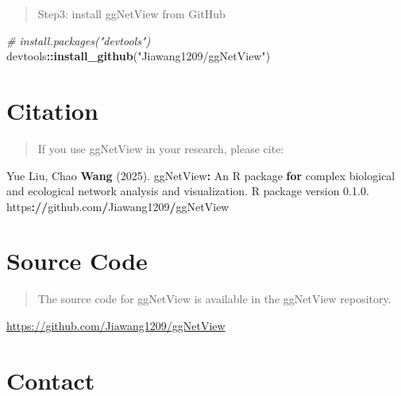 \documentclass[
]{book}
\newenvironment{Shaded}{\begin{snugshade}}{\end{snugshade}}
\newcommand{\CommentTok}[1]{\textcolor[rgb]{0.56,0.35,0.01}{\textit{#1}}}
\newcommand{\ControlFlowTok}[1]{\textcolor[rgb]{0.13,0.29,0.53}{\textbf{#1}}}
\newcommand{\DecValTok}[1]{\textcolor[rgb]{0.00,0.00,0.81}{#1}}
\newcommand{\ErrorTok}[1]{\textcolor[rgb]{0.64,0.00,0.00}{\textbf{#1}}}
\newcommand{\FloatTok}[1]{\textcolor[rgb]{0.00,0.00,0.81}{#1}}
\newcommand{\FunctionTok}[1]{\textcolor[rgb]{0.13,0.29,0.53}{\textbf{#1}}}
\newcommand{\NormalTok}[1]{#1}
\newcommand{\SpecialCharTok}[1]{\textcolor[rgb]{0.81,0.36,0.00}{\textbf{#1}}}
\newcommand{\StringTok}[1]{\textcolor[rgb]{0.31,0.60,0.02}{#1}}
\begin{document}
\begin{quote}
Step3: install ggNetView from GitHub
\end{quote}

\begin{Shaded}
\begin{Highlighting}[]
\CommentTok{\# install.packages("devtools")}
\NormalTok{devtools}\SpecialCharTok{::}\FunctionTok{install\_github}\NormalTok{(}\StringTok{"Jiawang1209/ggNetView"}\NormalTok{)}
\end{Highlighting}
\end{Shaded}

\section{Citation}\label{citation}

\begin{quote}
If you use ggNetView in your research, please cite:
\end{quote}

\begin{Shaded}
\begin{Highlighting}[]
\NormalTok{Yue Liu, Chao }\FunctionTok{Wang}\NormalTok{ (}\DecValTok{2025}\NormalTok{). ggNetView}\SpecialCharTok{:}\NormalTok{ An R package }\ControlFlowTok{for}\NormalTok{ complex biological and ecological network analysis and visualization. R package version }\DecValTok{0}\NormalTok{.}\DecValTok{1}\NormalTok{.}\FloatTok{0.} 
\NormalTok{https}\SpecialCharTok{:}\ErrorTok{//}\NormalTok{github.com}\SpecialCharTok{/}\NormalTok{Jiawang1209}\SpecialCharTok{/}\NormalTok{ggNetView}
\end{Highlighting}
\end{Shaded}

\section{Source Code}\label{source-code}

\begin{quote}
The source code for ggNetView is available in the ggNetView repository.
\end{quote}

\url{https://github.com/Jiawang1209/ggNetView}

\section{Contact}\label{contact}
\end{document}

